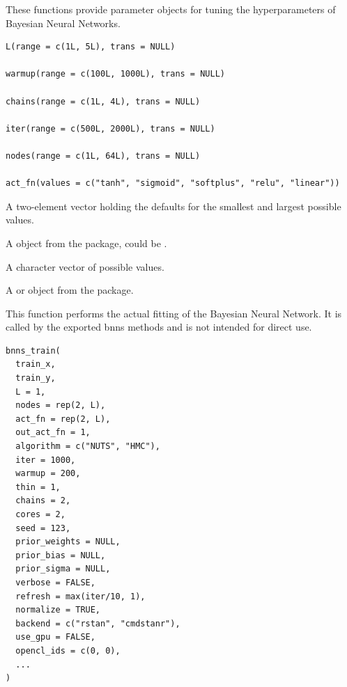 \documentclass[a4paper]{book}
\begin{document}
%
\begin{Description}
These functions provide  parameter objects for tuning
the hyperparameters of Bayesian Neural Networks.
\end{Description}
%
\begin{Usage}
\begin{verbatim}
L(range = c(1L, 5L), trans = NULL)

warmup(range = c(100L, 1000L), trans = NULL)

chains(range = c(1L, 4L), trans = NULL)

iter(range = c(500L, 2000L), trans = NULL)

nodes(range = c(1L, 64L), trans = NULL)

act_fn(values = c("tanh", "sigmoid", "softplus", "relu", "linear"))
\end{verbatim}
\end{Usage}
%
\begin{Arguments}
\begin{ldescription}
\item[\code{range}] A two-element vector holding the defaults for the smallest and largest possible values.

\item[\code{trans}] A  object from the  package, could be .

\item[\code{values}] A character vector of possible values.
\end{ldescription}
\end{Arguments}
%
\begin{Value}
A  or  object from the  package.
\end{Value}
%
\begin{Description}
This function performs the actual fitting of the Bayesian Neural Network.
It is called by the exported bnns methods and is not intended for direct use.
\end{Description}
%
\begin{Usage}
\begin{verbatim}
bnns_train(
  train_x,
  train_y,
  L = 1,
  nodes = rep(2, L),
  act_fn = rep(2, L),
  out_act_fn = 1,
  algorithm = c("NUTS", "HMC"),
  iter = 1000,
  warmup = 200,
  thin = 1,
  chains = 2,
  cores = 2,
  seed = 123,
  prior_weights = NULL,
  prior_bias = NULL,
  prior_sigma = NULL,
  verbose = FALSE,
  refresh = max(iter/10, 1),
  normalize = TRUE,
  backend = c("rstan", "cmdstanr"),
  use_gpu = FALSE,
  opencl_ids = c(0, 0),
  ...
)
\end{verbatim}
\end{Usage}
\end{document}
